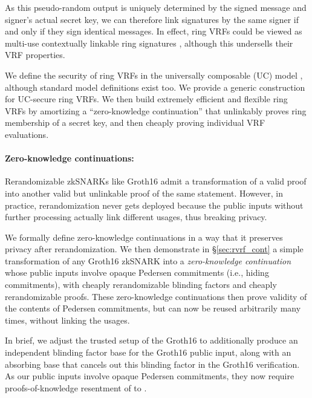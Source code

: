As this pseudo-random output is uniquely determined by the signed message
and signer's actual secret key, we can therefore link signatures by the
same signer if and only if they sign identical messages.
In effect, ring VRFs could be viewed as multi-use contextually linkable
 ring signatures \cite{ring_linkable,ring_linkablee},
although this undersells their VRF properties.

We define the security of ring VRFs in the universally composable (UC) model
\cite{canetti1,canetti2}, although standard model definitions exist too.
We provide a generic construction for UC-secure ring VRFs.
We then build extremely efficient and flexible ring VRFs by amortizing
a ``zero-knowledge continuation'' that unlinkably proves ring membership
of a secret key, and then cheaply proving individual VRF evaluations.


\paragraph{Zero-knowledge continuations:}

Rerandomizable zkSNARKs like Groth16 \cite{Groth16} admit a
transformation of a valid proof into another valid but unlinkable
proof of the same statement.  However, in practice, rerandomization
never gets deployed because the public inputs without further processing actually 
link different usages, thus breaking privacy.

We formally define zero-knowledge continuations in a way that it preserves privacy
 after rerandomization.
We then demonstrate in \S\ref{sec:rvrf_cont} a simple transformation of
any Groth16 zkSNARK into a {\it zero-knowledge continuation} whose
public inputs involve opaque Pedersen commitments (i.e., hiding commitments), with cheaply
rerandomizable blinding factors and cheaply rerandomizable proofs.
These zero-knowledge continuations then prove validity of the contents
of Pedersen commitments, but can now be reused arbitrarily many times,
without linking the usages.

In brief, we adjust the trusted setup of the Groth16 to additionally
produce an independent blinding factor base for the Groth16 public input, 
along with an absorbing base that cancels out this blinding factor in the
Groth16 verification.
As our public inputs involve opaque Pedersen commitments,
they now require proofs-of-knowledge resentment of to \cite{LegoSNARK}. 

